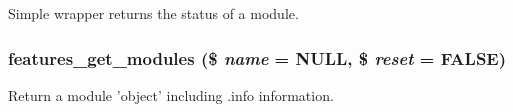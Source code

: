 \label{features_8module_ac5677f8406f4e9b5b37ae40783742a2e}
Simple wrapper returns the status of a module. \hypertarget{features_8module_a878b29e09c069a8be511070bbfedfaf9}{
\subsubsection[{features\_\-get\_\-modules}]{\setlength{\rightskip}{0pt plus 5cm}features\_\-get\_\-modules (\$ {\em name} = {\ttfamily NULL}, \/  \$ {\em reset} = {\ttfamily FALSE})}}
\label{features_8module_a878b29e09c069a8be511070bbfedfaf9}
Return a module 'object' including .info information.


